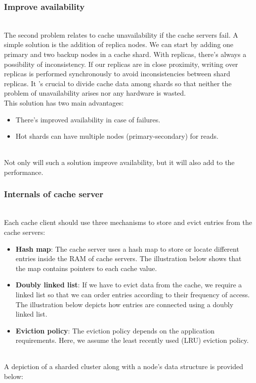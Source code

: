 \subsubsection{Improve availability}\label{LCtSEjcgfBGiU0G8G0dDX}
\\
The second problem relates to cache unavailability if the cache servers fail. A simple solution is the addition of replica nodes. We can start by adding one primary and two backup nodes in a cache shard. With replicas, there's always a possibility of inconsistency. If our replicas are in close proximity, writing over replicas is performed synchronously to avoid inconsistencies between shard replicas. It 's crucial to divide cache data among shards so that neither the problem of unavailability arises nor any hardware is wasted.
\\
This solution has two main advantages:

\begin{itemize}
\item
\protect{}\label{fnjdIKG4Avw9ojnX4qBbm}
There's improved availability in case of failures.
\item
\protect{}\label{FaE1_h_VTOSFU9JKGf8_G}
Hot shards can have multiple nodes (primary-secondary) for reads.
\end{itemize}
\\
Not only will such a solution improve availability, but it will also add to the performance.

\subsubsection{Internals of cache server}\label{ZZswMF6fFN4jNOphRMnoy}
\\
Each cache client should use three mechanisms to store and evict entries from the cache servers:

\begin{itemize}
\item
\protect{}\label{E1InucgkHbrzMCFrsuF2M}
\textbf{Hash map}: The cache server uses a hash map to store or locate different entries inside the RAM of cache servers. The illustration below shows that the map contains pointers to each cache value.
\item
\protect{}\label{RHxtCWcIlq17k5esKSQny}
\textbf{Doubly linked list}: If we have to evict data from the cache, we require a linked list so that we can order entries according to their frequency of access. The illustration below depicts how entries are connected using a doubly linked list.
\item
\protect{}\label{g0-ewotfiQ6sfHvK8GL4U}
\textbf{Eviction policy}: The eviction policy depends on the application requirements. Here, we assume the least recently used (LRU) eviction policy.
\end{itemize}
\\
A depiction of a sharded cluster along with a node's data structure is provided below:


